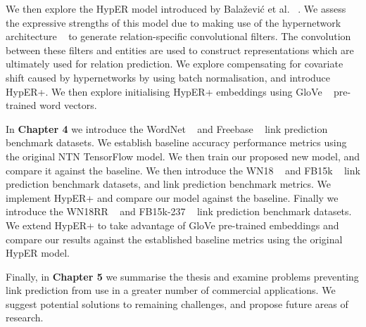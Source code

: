 \noindent We then explore the HypER model introduced by Bala\v{z}evi\'c et al. \unskip ~\citep{balazevic2019hypernetwork}. We assess the expressive strengths of this model due to making use of the hypernetwork architecture \unskip ~\citep{ha2016hypernetworks} to generate relation-specific convolutional filters. The convolution between these filters and entities are used to construct representations which are ultimately used for relation prediction. We explore compensating for covariate shift caused by hypernetworks by using batch normalisation, and introduce HypER+. We then explore initialising HypER+ embeddings using GloVe \unskip~\citep{pennington2014glove} pre-trained word vectors. \par

\noindent In \textbf{Chapter 4} we introduce the WordNet \unskip ~\citep{miller1995wordnet} and Freebase \unskip ~\citep{bollacker2008freebase} link prediction benchmark datasets. We establish baseline accuracy performance metrics using the original NTN TensorFlow model. We then train our proposed new model, and compare it against the baseline. We then introduce the WN18 \unskip ~\citep{bordes2014semantic} and FB15k \unskip ~\citep{bordes2013translating} link prediction benchmark datasets, and link prediction benchmark metrics. We implement HypER+ and compare our model against the baseline. Finally we introduce the WN18RR \unskip ~\citep{dettmers2018convolutional} and FB15k-237 \unskip ~\citep{toutanova2015observed} link prediction benchmark datasets. We extend HypER+ to take advantage of GloVe pre-trained embeddings and compare our results against the established baseline metrics using the original HypER model. \par

\noindent Finally, in \textbf{Chapter 5} we summarise the thesis and examine problems preventing link prediction from use in a greater number of commercial applications. We suggest potential solutions to remaining challenges, and propose future areas of research.

